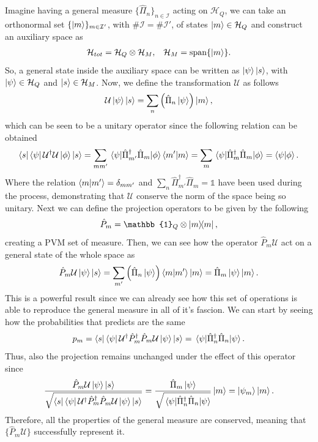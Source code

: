 {
    Imagine having a general measure $\{ \hat{\Pi}_n \}_{n\in\mathcal{I}}$ acting on $\mathcal{H}_Q$, we can take an orthonormal set $\{ \ket{m} \}_{m\in\mathcal{I}'}$, with $\#\mathcal{I} = \#\mathcal{I}'$, of states $\ket{m}\in \mathcal{H}_Q$ and construct an auxiliary space as
    \begin{align}
        &\mathcal{H}_{tot} = \mathcal{H}_Q\otimes \mathcal{H}_M, &\mathcal{H}_M = \text{span}\{\ket{m}\}.
    \end{align}
    So, a general state inside the auxiliary space can be written as $\ket{\psi}\ket{s}$, with $\ket{\psi}\in \mathcal{H}_Q$ and $\ket{s}\in\mathcal{H}_M$. Now, we define the transformation $\mathcal{U}$ as follows
    \begin{equation}
        \mathcal{U}\ket{\psi}\ket{s} = \sum_n \left( \hat{\Pi}_n\ket{\psi} \right)\ket{m},
    \end{equation}
    which can be seen to be a unitary operator since the following relation can be obtained
    \begin{equation}
        \bra{s}\bra{\psi}\mathcal{U}^\dagger\mathcal{U}\ket{\phi}\ket{s} = \sum_{mm'}\mel{\psi}{\hat{\Pi}_{m'}^\dagger\hat{\Pi}_m}{\phi}\braket{m'}{m} = \sum_m \mel{\psi}{\hat{\Pi}_{m}^\dagger\hat{\Pi}_m}{\phi} = \braket{\psi}{\phi}.
    \end{equation}
    Where the relation $\braket{m}{m'} = \delta_{mm'}$ and $\sum_n \hat{\Pi}_{m'}^\dagger\hat{\Pi}_m = \mathbb{1}$ have been used during the process, demonstrating that $\mathcal{U}$ conserve the norm of the space being so unitary. Next we can define the projection operators to be given by the following
    \begin{equation}
        \hat{P}_m = \mathbb{1}_Q \otimes \ketbra{m},
    \end{equation}
    creating a PVM set of measure. Then, we can see how the operator $\hat{P}_m\mathcal{U}$ act on a general state of the whole space as
    \begin{equation}
        \hat{P}_m\mathcal{U}\ket{\psi}\ket{s} = \sum_{m'} \left( \hat{\Pi}_n\ket{\psi} \right)\braket{m}{m'} \ket{m}= \hat{\Pi}_m\ket{\psi}\ket{m}.
    \end{equation}
    This is a powerful result since we can already see how this set of operations is able to reproduce the general measure in all of it's fascion. We can start by seeing how the probabilities that predicts are the same
    \begin{equation}
        p_m = \bra{s}\bra{\psi}\mathcal{U}^\dagger\hat{P}_m^\dagger\hat{P}_m\mathcal{U}\ket{\psi}\ket{s} = \ev{\hat{\Pi}_n^\dagger\hat{\Pi}_n}{\psi}.
    \end{equation}
    Thus, also the projection remains unchanged under the effect of this operator since
    \begin{equation}
        \frac{\hat{P}_m\mathcal{U}\ket{\psi}\ket{s}}{\sqrt{\bra{s}\bra{\psi}\mathcal{U}^\dagger\hat{P}_m^\dagger\hat{P}_m\mathcal{U}\ket{\psi}\ket{s}}} = \frac{\hat{\Pi}_m\ket{\psi}}{\sqrt{\ev{\hat{\Pi}_n^\dagger\hat{\Pi}_n}{\psi}}}\ket{m} = \ket{\psi_m}\ket{m}.
    \end{equation}
    Therefore, all the properties of the general measure are conserved, meaning that $\{ \hat{P}_m\mathcal{U} \}$ successfully represent it.
}
